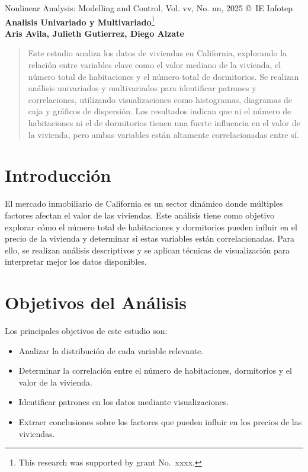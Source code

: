 \documentclass[a4paper, 10pt]{article}
\begin{document}
\begin{center}
Nonlinear Analysis: Modelling and Control, Vol. vv, No. nn, 2025
\copyright\ IE Infotep\\[24pt]
\LARGE
\textbf{Analisis Univariado y Multivariado}\footnote{This research was supported by grant No.\ xxxx.}\\[6pt]
\small
\textbf {Aris Avila, Julieth Gutierrez, Diego Alzate}\\[6pt]
\end{center}

\begin{abstract}
Este estudio analiza los datos de viviendas en California, explorando la relación entre variables clave como el valor mediano de la vivienda, el número total de habitaciones y el número total de dormitorios. Se realizan análisis univariados y multivariados para identificar patrones y correlaciones, utilizando visualizaciones como histogramas, diagramas de caja y gráficos de dispersión. Los resultados indican que ni el número de habitaciones ni el de dormitorios tienen una fuerte influencia en el valor de la vivienda, pero ambas variables están altamente correlacionadas entre sí. 
\end{abstract}

\section{Introducción}
El mercado inmobiliario de California es un sector dinámico donde múltiples factores afectan el valor de las viviendas. Este análisis tiene como objetivo explorar cómo el número total de habitaciones y dormitorios pueden influir en el precio de la vivienda y determinar si estas variables están correlacionadas. Para ello, se realizan análisis descriptivos y se aplican técnicas de visualización para interpretar mejor los datos disponibles.

\section{Objetivos del Análisis}
Los principales objetivos de este estudio son:
\begin{itemize}
    \item Analizar la distribución de cada variable relevante.
    \item Determinar la correlación entre el número de habitaciones, dormitorios y el valor de la vivienda.
    \item Identificar patrones en los datos mediante visualizaciones.
    \item Extraer conclusiones sobre los factores que pueden influir en los precios de las viviendas.
\end{itemize}
\end{document}
